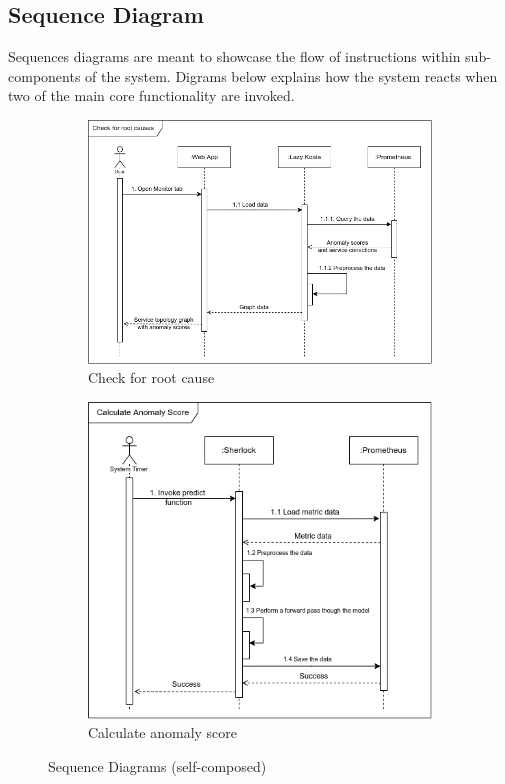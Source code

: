 \subsection{Sequence Diagram}

Sequences diagrams are meant to showcase the flow of instructions within sub-components of the system. Digrams below explains how the system reacts when two of the main core functionality are invoked.

\begin{figure}[H]
    \centering
    \begin{subfigure}[b]{0.8\textwidth}
        \centering
        \includegraphics[width=\textwidth]{assets/system-design/sequence-diagram-1.png}
        \caption{Check for root cause}
    \end{subfigure}
    \hfill
    \begin{subfigure}[b]{0.79\textwidth}
        \centering
        \includegraphics[width=\textwidth]{assets/system-design/sequence-diagram-2.png}
        \caption{Calculate anomaly score}
    \end{subfigure}
    \hfill
       \caption{Sequence Diagrams (self-composed)}
\end{figure}

